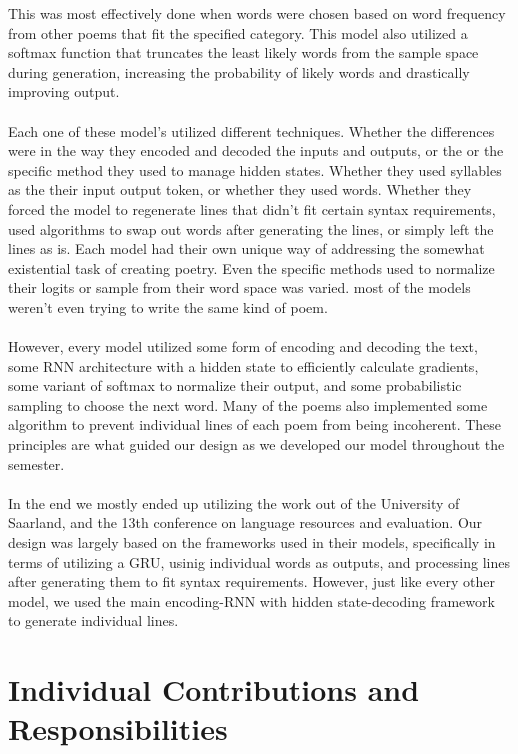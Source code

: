 \documentclass{article} %
\begin{document}
This was most effectively done when words were chosen based on word frequency from other poems that fit the specified category. 
This model also utilized a softmax function that truncates the least likely words from the sample space during generation, increasing the probability of likely words and drastically improving output.\\\\
Each one of these model's utilized different techniques. Whether the differences were in the way they encoded and decoded the inputs and outputs, or the or the specific method they used to manage hidden states. Whether they used syllables as the their input output token, or whether they used words. Whether they forced the model to regenerate lines that didn't fit certain syntax requirements, used algorithms to swap out words after generating the lines, or simply left the lines as is. Each model had their own unique way of addressing the somewhat existential task of creating poetry. Even the specific methods used to normalize their logits or sample from their word space was varied. most of the models weren't even trying to write the same kind of poem.\\\\ 
However, every model utilized some form of encoding and decoding the text, some RNN architecture with a hidden state to efficiently calculate gradients, some variant of softmax to normalize their output, and some probabilistic sampling to choose the next word. Many of the poems also implemented some algorithm to prevent individual lines of each poem from being incoherent. These principles are what guided our design as we developed our model throughout the semester.\\\\
In the end we mostly ended up utilizing the work out of the University of Saarland, and the 13th conference on language resources and evaluation. Our design was largely based on the frameworks used in their models, specifically in terms of utilizing a GRU, usinig individual words as outputs, and processing lines after generating them to fit syntax requirements. However, just like every other model, we used the main encoding-RNN with hidden state-decoding framework to generate individual lines.





\section{Individual Contributions and Responsibilities}
\end{document}
